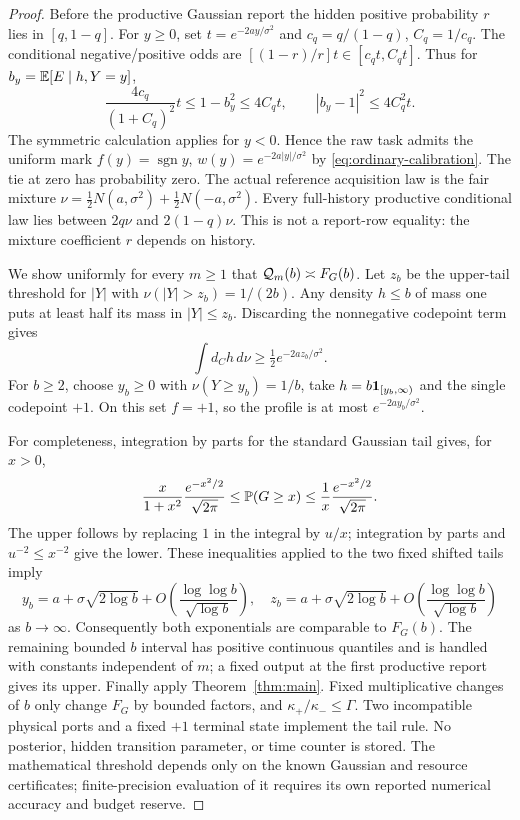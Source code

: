 \begin{proof}
Before the productive Gaussian report the hidden positive probability $r$ lies in $[q,1-q]$. For $y\ge0$, set $t=e^{-2ay/\sigma^2}$ and $c_q=q/(1-q)$, $C_q=1/c_q$. The conditional negative/positive odds are $[(1-r)/r]t\in[c_qt,C_qt]$. Thus for $b_y=\mathbb E[E\mid h,Y=y]$,
\[
 \frac{4c_q}{(1+C_q)^2}t\le1-b_y^2\le4C_qt,
 \qquad |b_y-1|^2\le4C_q^2t.
\]
The symmetric calculation applies for $y<0$. Hence the raw task admits the uniform mark
$f(y)=\operatorname{sgn}y$, $w(y)=e^{-2a|y|/\sigma^2}$ by \eqref{eq:ordinary-calibration}. The tie at zero has probability zero. The actual reference acquisition law is the fair mixture
$\nu=\frac12N(a,\sigma^2)+\frac12N(-a,\sigma^2)$. Every full-history productive conditional law lies between $2q\nu$ and $2(1-q)\nu$. This is not a report-row equality: the mixture coefficient $r$ depends on history.

We show uniformly for every $m\ge1$ that $\mathcal Q_m(b)\asymp F_G(b)$. Let $z_b$ be the upper-tail threshold for $|Y|$ with $\nu(|Y|>z_b)=1/(2b)$. Any density $h\le b$ of mass one puts at least half its mass in $|Y|\le z_b$. Discarding the nonnegative codepoint term gives
\[
 \int d_Ch\,d\nu\ge\tfrac12e^{-2az_b/\sigma^2}.
\]
For $b\ge2$, choose $y_b\ge0$ with $\nu(Y\ge y_b)=1/b$, take $h=b\mathbf1_{[y_b,\infty)}$ and the single codepoint $+1$. On this set $f=+1$, so the profile is at most $e^{-2ay_b/\sigma^2}$.

For completeness, integration by parts for the standard Gaussian tail gives, for $x>0$,
\[
 \frac{x}{1+x^2}\frac{e^{-x^2/2}}{\sqrt{2\pi}}
 \le\mathbb P(G\ge x)\le
 \frac1x\frac{e^{-x^2/2}}{\sqrt{2\pi}}.
\]
The upper follows by replacing $1$ in the integral by $u/x$; integration by parts and $u^{-2}\le x^{-2}$ give the lower. These inequalities applied to the two fixed shifted tails imply
\[
 y_b=a+\sigma\sqrt{2\log b}+O\!\left(\frac{\log\log b}{\sqrt{\log b}}\right),\quad
 z_b=a+\sigma\sqrt{2\log b}+O\!\left(\frac{\log\log b}{\sqrt{\log b}}\right)
\]
as $b\to\infty$. Consequently both exponentials are comparable to $F_G(b)$. The remaining bounded $b$ interval has positive continuous quantiles and is handled with constants independent of $m$; a fixed output at the first productive report gives its upper. Finally apply Theorem~\ref{thm:main}. Fixed multiplicative changes of $b$ only change $F_G$ by bounded factors, and $\kappa_+/\kappa_-\le\Gamma$. Two incompatible physical ports and a fixed $+1$ terminal state implement the tail rule. No posterior, hidden transition parameter, or time counter is stored. The mathematical threshold depends only on the known Gaussian and resource certificates; finite-precision evaluation of it requires its own reported numerical accuracy and budget reserve.
\end{proof}
